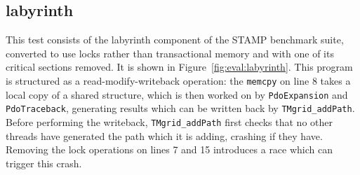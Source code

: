 

\subsection{labyrinth}

This test consists of the labyrinth component of the STAMP benchmark
suite\needCite{}, converted to use locks rather than transactional
memory and with one of its critical sections removed.  It is shown in
Figure~\ref{fig:eval:labyrinth}.  This program is structured as a
read-modify-writeback operation: the \texttt{memcpy} on line 8 takes a
local copy of a shared structure, which is then worked on by
\texttt{PdoExpansion} and \texttt{PdoTraceback}, generating results
which can be written back by \texttt{TMgrid\_addPath}.  Before
performing the writeback, \texttt{TMgrid\_addPath} first checks that
no other threads have generated the path which it is adding, crashing
if they have.  Removing the lock operations on lines 7 and 15
introduces a race which can trigger this crash.

